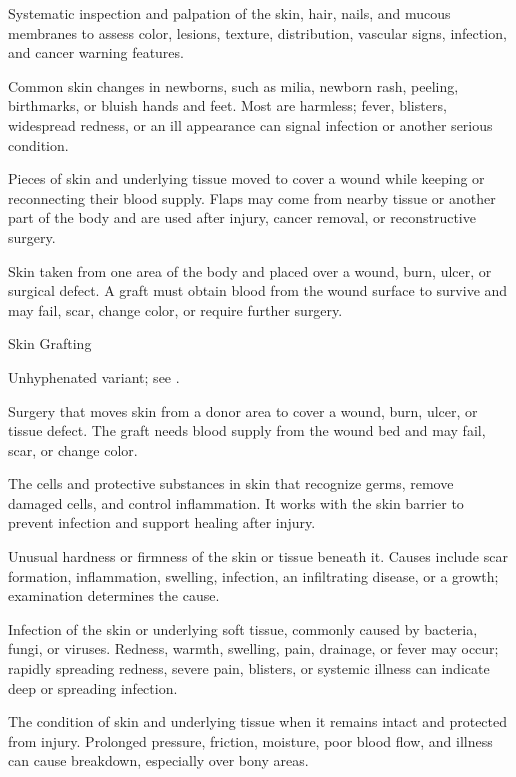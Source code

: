  Systematic inspection and palpation of the skin, hair, nails, and mucous membranes to assess color, lesions, texture, distribution, vascular signs, infection, and cancer warning features.

 Common skin changes in newborns, such as milia, newborn rash, peeling, birthmarks, or bluish hands and feet. Most are harmless; fever, blisters, widespread redness, or an ill appearance can signal infection or another serious condition.

 Pieces of skin and underlying tissue moved to cover a wound while keeping or reconnecting their blood supply. Flaps may come from nearby tissue or another part of the body and are used after injury, cancer removal, or reconstructive surgery.

 Skin taken from one area of the body and placed over a wound, burn, ulcer, or surgical defect. A graft must obtain blood from the wound surface to survive and may fail, scar, change color, or require further surgery.

\synonyms
Skin Grafting

 Unhyphenated variant; see .

 Surgery that moves skin from a donor area to cover a wound, burn, ulcer, or tissue defect. The graft needs blood supply from the wound bed and may fail, scar, or change color.

 The cells and protective substances in skin that recognize germs, remove damaged cells, and control inflammation. It works with the skin barrier to prevent infection and support healing after injury.

 Unusual hardness or firmness of the skin or tissue beneath it. Causes include scar formation, inflammation, swelling, infection, an infiltrating disease, or a growth; examination determines the cause.

 Infection of the skin or underlying soft tissue, commonly caused by bacteria, fungi, or viruses. Redness, warmth,
swelling, pain, drainage, or fever may occur; rapidly spreading redness, severe pain, blisters, or systemic
illness can indicate deep or spreading infection.

 The condition of skin and underlying tissue when it remains intact and protected from injury. Prolonged pressure, friction, moisture, poor blood flow, and illness can cause breakdown, especially over bony areas.

